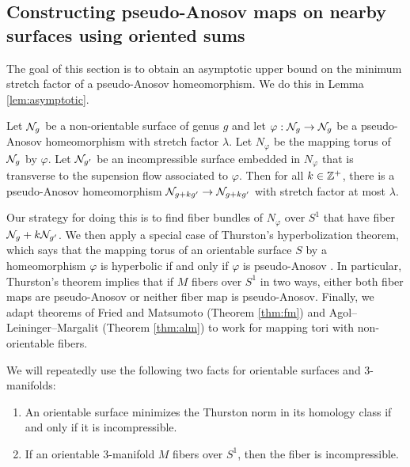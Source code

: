 \subsection{Constructing pseudo-Anosov maps on nearby surfaces using oriented sums}
\label{sec:constr-psuedo-anos}
The goal of this section is to obtain an asymptotic upper bound on the minimum stretch factor of a pseudo-Anosov homeomorphism. We do this in Lemma \ref{lem:asymptotic}.


\begin{lem}\label{lem:asymptotic}
Let $\mathcal{N}_g$ be a non-orientable surface of genus $g$ and let $\varphi:\mathcal{N}_g\rightarrow \mathcal{N}_g$ be a pseudo-Anosov homeomorphism with stretch factor $\lambda$.  Let $N_\varphi$ be the mapping torus of $\mathcal{N}_g$ by $\varphi$.  Let $\mathcal{N}_{g'}$ be an incompressible surface embedded in $N_\varphi$ that is transverse to the supension flow associated to $\varphi$.  Then for all $k\in\mathbb{Z}^+$, there is a pseudo-Anosov homeomorphism $\mathcal{N}_{g+kg'}\rightarrow\mathcal{N}_{g+kg'}$ with stretch factor at most $\lambda$.
\end{lem}

Our strategy for doing this is to find fiber bundles of $N_{\varphi}$ over $S^1$ that have fiber $\mathcal{N}_g+k\mathcal{N}_{g'}$.  We then apply a special case of Thurston's hyperbolization theorem, which says that the mapping torus of an orientable surface $S$ by a homeomorphism $\varphi$ is hyperbolic if and only if $\varphi$ is pseudo-Anosov \cite[Theorem 0.1]{thurston_hyp}.  In particular, Thurston's theorem implies that if $M$ fibers over $S^1$ in two ways, either both fiber maps are pseudo-Anosov or neither fiber map is pseudo-Anosov.  Finally, we adapt theorems of Fried and Matsumoto (Theorem \ref{thm:fm}) and Agol--Leininger--Margalit (Theorem \ref{thm:alm}) to work for mapping tori with non-orientable fibers.



We will repeatedly use the following two facts for orientable surfaces and 3-manifolds:
\begin{enumerate}
 \item An orientable surface minimizes the Thurston norm in its homology class if and only if it is incompressible.
\item  If an orientable 3-manifold $M$ fibers over $S^1$, then the fiber is incompressible.
\end{enumerate}




